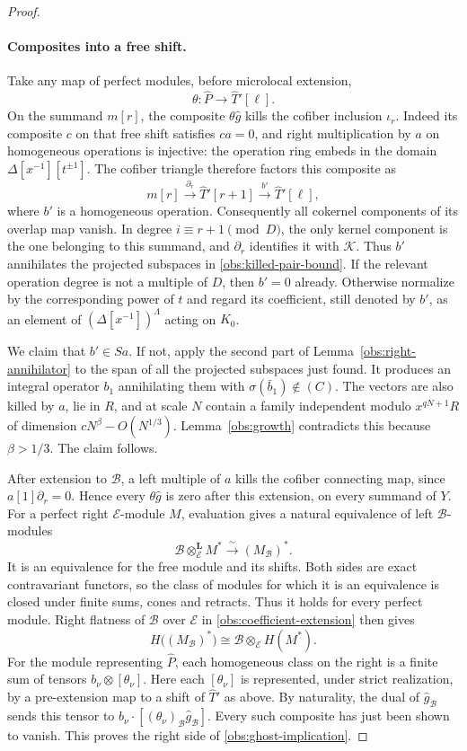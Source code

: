 \begin{proof}
\paragraph{Composites into a free shift.}
Take any map of perfect modules, before microlocal extension,
\[
 \theta:\widehat P\longrightarrow\widehat T'[\ell].
\]
On the summand $m[r]$, the composite $\theta\widehat g$ kills
the cofiber inclusion $\iota_r$.  Indeed its composite $c$ on
that free shift satisfies $ca=0$, and right multiplication by
$a$ on homogeneous operations is injective: the operation ring
embeds in the domain $\Delta[x^{-1}][t^{\pm1}]$.
The cofiber triangle therefore factors this composite as
\[
 m[r]\xrightarrow{\partial_r}\widehat T'[r+1]
             \xrightarrow{b'}\widehat T'[\ell],
\]
where $b'$ is a homogeneous operation.  Consequently all
cokernel components of its overlap map vanish.
In degree $i\equiv r+1\pmod D$, the only kernel component is
the one belonging to this summand, and $\partial_r$ identifies
it with $\mathcal K$.  Thus $b'$ annihilates the projected
subspaces in \eqref{obs:killed-pair-bound}.
If the relevant operation degree is not a multiple of $D$,
then $b'=0$ already.  Otherwise normalize by the corresponding
power of $t$ and regard its coefficient, still denoted by $b'$,
as an element of $(\Delta[x^{-1}])^\Lambda$ acting on $K_0$.

We claim that $b'\in Sa$.  If not, apply the second part of
Lemma~\ref{obs:right-annihilator} to the span of all the
projected subspaces just found.  It produces an integral
operator $b_1$ annihilating them with
$\sigma(\bar b_1)\notin(C)$.  The vectors are also killed by
$a$, lie in $R$, and at scale $N$ contain a family independent
modulo $x^{qN+1}R$ of dimension
$cN^\beta-O(N^{1/3})$.  Lemma~\ref{obs:growth} contradicts
this because $\beta>1/3$.  The claim follows.

After extension to $\mathscr B$, a left multiple of $a$ kills
the cofiber connecting map, since $a[1]\partial_r=0$.
Hence every $\theta\widehat g$ is zero after this extension,
on every summand of $Y$.
For a perfect right $\mathscr E$-module $M$, evaluation gives a
natural equivalence of left $\mathscr B$-modules
\[
 \mathscr B\otimes_{\mathscr E}^{\mathbf L}M^*
 \xrightarrow{\ \sim\ }(M_{\mathscr B})^*.
\]
It is an equivalence for the free module and its shifts.  Both
sides are exact contravariant functors, so the class of modules
for which it is an equivalence is closed under finite sums,
cones and retracts.  Thus it holds for every perfect module.
Right flatness of $\mathscr B$ over $\mathscr E$ in
\eqref{obs:coefficient-extension} then gives
\[
 H\bigl((M_{\mathscr B})^*\bigr)
 \cong\mathscr B\otimes_{\mathscr E}H(M^*).
\]
For the module representing $\widehat P$, each homogeneous class
on the right is a finite sum of tensors $b_\nu\otimes[\theta_\nu]$.
Here each $[\theta_\nu]$ is represented, under strict realization,
by a pre-extension map to a shift of $\widehat T'$ as above.
By naturality, the dual of $\widehat g_{\mathscr B}$ sends this tensor
to $b_\nu\cdot[(\theta_\nu)_{\mathscr B}\widehat g_{\mathscr B}]$.
Every such composite has just been shown to vanish.  This proves
the right side of \eqref{obs:ghost-implication}.
\end{proof}

